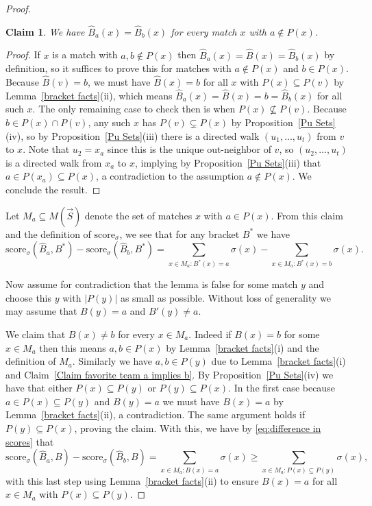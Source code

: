 \documentclass[12pt,letterpaper]{article}
\newtheorem{claim}[thm]{Claim}
\theoremstyle{definition}
\newcommand{\sig}{\sigma}
\renewcommand{\1}{\mathbbm{1}}
\newcommand{\sub}{\subseteq}
\newcommand{\score}{\mathrm{score}}
\newcommand{\tour}{\vec{S}}
\begin{document}
\begin{proof}
	\begin{claim}
		We have $\widehat{B}_a(x)=\widehat{B}_b(x)$ for every match $x$ with $a\notin P(x)$.
	\end{claim}
	\begin{proof}
		If $x$ is a match with $a,b\notin P(x)$ then $\widehat{B}_a(x)=\widehat{B}(x)=\widehat{B}_b(x)$ by definition, so it suffices to prove this for matches with $a\notin P(x)$ and $b\in P(x)$.  Because $\widehat{B}(v)=b$, we must have $\widehat{B}(x)=b$ for all $x$ with $P(x)\sub P(v)$ by Lemma~\ref{bracket facts}(ii), which means $\widehat{B}_a(x)=\widehat{B}(x)=b=\widehat{B}_b(x)$ for all such $x$.  The only remaining case to check then is when $P(x)\not \sub P(v)$.  Because $b\in P(x)\cap P(v)$, any such $x$ has $P(v)\subsetneq P(x)$ by Proposition~\ref{Pu Sets}(iv), so by Proposition~\ref{Pu Sets}(iii) there is a directed walk $(u_1,\ldots,u_t)$ from $v$ to $x$.  Note that $u_2=x_a$ since this is the unique out-neighbor of $v$, so $(u_2,\ldots,u_t)$ is a directed walk from $x_a$ to $x$, implying by Proposition~\ref{Pu Sets}(iii) that $a\in P(x_a)\sub P(x)$, a contradiction to the assumption $a\notin P(x)$.  We conclude the result.
	\end{proof}
	Let $M_a\sub M(\tour)$ denote the set of matches $x$ with $a\in P(x)$.  From this claim and the definition of $\score_\sig$, we see that for any bracket $B^*$ we have
		\begin{equation}\score_\sig(\widehat{B}_a,B^*)-\score_\sig(\widehat{B}_b,B^*)=\sum_{x\in M_a:B^*(x)=a}\sig(x)-\sum_{x\in M_a:B^*(x)=b}\sig(x).\label{eq:difference in scores}\end{equation}

	Now assume for contradiction that the lemma is false for some match $y$ and choose this $y$ with $|P(y)|$ as small as possible.  Without loss of generality we may assume that $B(y)=a$ and $B'(y)\ne a$.
	
	We claim that $B(x)\ne b$ for every $x\in M_a$.  Indeed if $B(x)=b$ for some $x\in M_a$ then this means $a,b\in P(x)$ by Lemma~\ref{bracket facts}(i) and the definition of $M_a$.  Similarly we have $a,b\in P(y)$ due to Lemma~\ref{bracket facts}(i) and Claim~\ref{Claim favorite team a implies b}.  By Proposition~\ref{Pu Sets}(iv) we have that either $P(x)\sub P(y)$ or $P(y)\sub P(x)$.  In the first case because $a\in P(x)\sub P(y)$ and $B(y)=a$ we must have $B(x)=a$ by Lemma~\ref{bracket facts}(ii), a contradiction.  The same argument holds if $P(y)\sub P(x)$, proving the claim.  With this, we have by \eqref{eq:difference in scores} that
	\[\score_\sig(\widehat{B}_a,B)-\score_\sig(\widehat{B}_b,B)= \sum_{x\in M_a:B(x)=a}\sig(x)\ge \sum_{x\in M_a: P(x)\sub P(y)} \sig(x),\]
	with this last step using Lemma~\ref{bracket facts}(ii) to ensure $B(x)=a$ for all $x\in M_a$ with $P(x)\sub P(y)$.
	

\end{proof}
\end{document}
